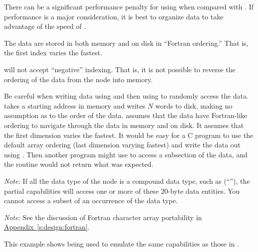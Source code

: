 There can be a significant performance penalty for using
 when compared with
\hyperlink{sub:Read\_All\_Data}{}.
If performance is a major consideration, it is best to organize
data to take advantage of the speed of .

The data are stored in both memory and on disk in ``Fortran ordering.''
That is, the first index varies the fastest.

 will not accept ``negative'' indexing.
That is, it is not possible to reverse the ordering of the data from the
node into memory.

Be careful when writing data using
\hyperlink{sub:Write\_All\_Data}{} and then using
 to randomly access the data.
 takes a starting address in memory and
writes $N$ words to disk, making no assumption as to the order of
the data.
 assumes that the data have Fortran-like ordering
to navigate through the data in memory and on disk.
It assumes that the first dimension varies the fastest.
It would be easy for a C program to use the default array ordering
(last dimension varying fastest) and write the data out using
.
Then another program might use  to access a
subsection of the data, and the routine would not return what was
expected.

\noindent
\emph{Note:}
If all the data type of the node is a compound data type, such as
(``''), the partial capabilities will access one or more
of these 20-byte data entities.
You cannot access a subset of an occurrence of the data type.

\noindent
\emph{Note:}
See the discussion of Fortran character array portability in
\hyperref[s:design:fortran]{Appendix~\ref*{s:design:fortran}}.


This example shows  being used to emulate the same
capabilities as those in \hyperlink{sub:Read\_All\_Data}{}.

